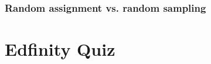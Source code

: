 \documentclass[slidestop,compress,mathserif]{beamer}
\begin{document}


\begin{frame}
	\frametitle{Random assignment vs. random sampling}

	\begin{center}
	\end{center}

\end{frame}


\section{Edfinity Quiz}


\end{document}
